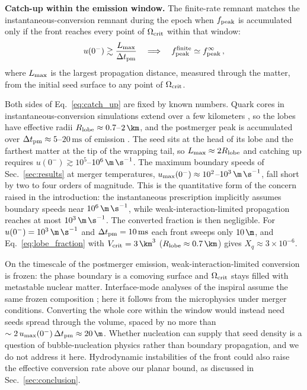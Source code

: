 \textbf{Catch-up within the emission window.}
The finite-rate remnant matches the instantaneous-conversion remnant during the epoch when $f_{\rm peak}$ is accumulated only if the front reaches every point of $\Omega_{\rm crit}$ within that window:
\begin{equation}
u(0^-)\gtrsim\frac{L_{\rm max}}{\Delta t_{\rm pm}}
\quad\Longrightarrow\quad
f_{\rm peak}^{\rm finite}\simeq f_{\rm peak}^{\infty}\,,
\label{eq:catch_up}
\end{equation}
where $L_{\rm max}$ is the largest propagation distance, measured through the matter, from the initial seed surface to any point of $\Omega_{\rm crit}$.

Both sides of Eq.~\eqref{eq:catch_up} are fixed by known numbers.
Quark cores in instantaneous-conversion simulations extend over a few kilometers \cite{Most:2018eaw,Bauswein:2018bma}, so the lobes have effective radii $R_{\rm lobe}\approx0.7$--$2\,\km$, and the postmerger peak is accumulated over $\Delta t_{\rm pm}\approx5$--$20\,\text{ms}$ of emission \cite{Takami:2014tva,Vretinaris:2019spn}.
The seed sits at the head of its lobe and the farthest matter at the tip of the wrapping tail, so $L_{\rm max}\approx2R_{\rm lobe}$ and catching up requires $u(0^-)\gtrsim10^{5}$--$10^{6}\,\m\,\s^{-1}$.
The maximum boundary speeds of Sec.~\ref{sec:results} at merger temperatures, $u_{\rm max}(0^-)\approx10^{2}$--$10^{3}\,\m\,\s^{-1}$, fall short by two to four orders of magnitude.
This is the quantitative form of the concern raised in the introduction: the instantaneous prescription implicitly assumes boundary speeds near $10^{6}\,\m\,\s^{-1}$, while weak-interaction-limited propagation reaches at most $10^{3}\,\m\,\s^{-1}$.
The converted fraction is then negligible.
For $u(0^-)=10^{3}\,\m\,\s^{-1}$ and $\Delta t_{\rm pm}=10\,\text{ms}$ each front sweeps only $10\,\m$, and Eq.~\eqref{eq:lobe_fraction} with $V_{\rm crit}=3\,\km^{3}$ ($R_{\rm lobe}\approx0.7\,\km$) gives $X_q\approx3\times10^{-6}$.

On the timescale of the postmerger emission, weak-interaction-limited conversion is frozen: the phase boundary is a comoving surface and $\Omega_{\rm crit}$ stays filled with metastable nuclear matter.
Interface-mode analyses of the inspiral assume the same frozen composition \cite{Tonetto:2020bie,Counsell:2025hcv,Pereira:2025xsi}; here it follows from the microphysics under merger conditions.
Converting the whole core within the window would instead need seeds spread through the volume, spaced by no more than $\sim2\,u_{\rm max}(0^-)\,\Delta t_{\rm pm}\approx20\,\m$.
Whether nucleation can supply that seed density is a question of bubble-nucleation physics rather than boundary propagation, and we do not address it here.
Hydrodynamic instabilities of the front could also raise the effective conversion rate above our planar bound, as discussed in Sec.~\ref{sec:conclusion}.

